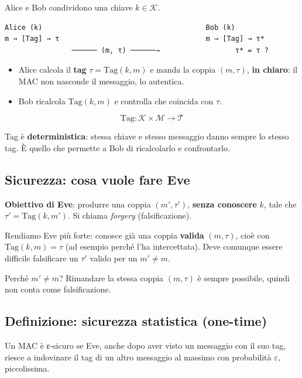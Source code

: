 Alice e Bob condividono una chiave \(k \in \mathcal{K}\).

\begin{verbatim}
Alice (k)                                       Bob (k)
m → [Tag] → τ                                   m → [Tag] → τ*
                ────── (m, τ) ──────→                  τ* = τ ?
\end{verbatim}

\begin{itemize}
\tightlist
\item
  Alice calcola il \textbf{tag} \(\tau = \text{Tag}(k, m)\) e manda la coppia \((m, \tau)\), \textbf{in chiaro}: il MAC non nasconde il messaggio, lo autentica.
\item
  Bob ricalcola \(\text{Tag}(k, m)\) e controlla che coincida con \(\tau\).
\end{itemize}

\[
\text{Tag}: \mathcal{K} \times \mathcal{M} \to \mathcal{T}
\]

Tag è \textbf{deterministica}: stessa chiave e stesso messaggio danno sempre lo stesso tag. È quello che permette a Bob di ricalcolarlo e confrontarlo.

\subsection{Sicurezza: cosa vuole fare Eve}

\textbf{Obiettivo di Eve}: produrre una coppia \((m', \tau')\), \textbf{senza conoscere} \(k\), tale che \(\tau' = \text{Tag}(k, m')\). Si chiama \emph{forgery} (falsificazione).

Rendiamo Eve più forte: conosce già una coppia \textbf{valida} \((m, \tau)\), cioè con \(\text{Tag}(k, m) = \tau\) (ad esempio perché l'ha intercettata). Deve comunque essere difficile falsificare un \(\tau'\) valido per un \(m' \ne m\).

\begin{nota}

Perché \(m' \ne m\)? Rimandare la stessa coppia \((m, \tau)\) è sempre possibile, quindi non conta come falsificazione.

\end{nota}

\subsection{Definizione: sicurezza statistica (one-time)}

\begin{inbreve}

Un MAC è ε-sicuro se Eve, anche dopo aver visto un messaggio con il suo tag, riesce a indovinare il tag di un altro messaggio al massimo con probabilità \(\varepsilon\), piccolissima.

\end{inbreve}

